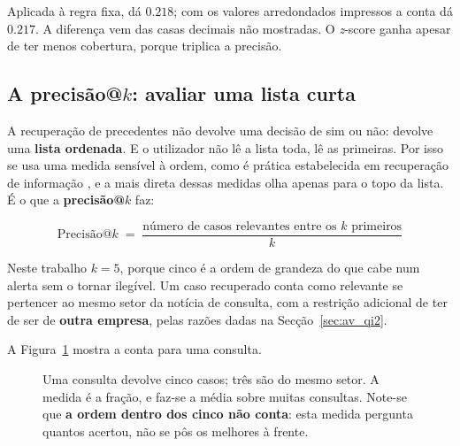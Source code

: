 Aplicada à regra fixa, dá $0.218$; com os valores arredondados impressos a conta dá $0.217$. A
diferença vem das casas decimais não mostradas. O \emph{z}-score ganha apesar de ter menos cobertura,
porque triplica a precisão.

\subsection{A precisão@\texorpdfstring{$k$}{k}: avaliar uma lista curta}
\label{sec:av_patk}

A recuperação de precedentes não devolve uma decisão de sim ou não: devolve uma \textbf{lista
ordenada}. E o utilizador não lê a lista toda, lê as primeiras. Por isso se usa uma medida sensível
à ordem, como é prática estabelecida em recuperação de informação \autocite{manning2008ir}, e a mais
direta dessas medidas olha apenas para o topo da lista. É o que a \textbf{precisão@$k$} faz:

\begin{equation}
  \text{Precisão@}k \;=\; \frac{\text{número de casos relevantes entre os } k \text{ primeiros}}{k}
  \label{eq:patk}
\end{equation}

Neste trabalho $k = 5$, porque cinco é a ordem de grandeza do que cabe num alerta sem o tornar
ilegível. Um caso recuperado conta como relevante se pertencer ao mesmo setor da notícia de consulta,
com a restrição adicional de ter de ser de \textbf{outra empresa}, pelas razões dadas na
Secção~\ref{sec:av_qi2}.

A Figura~\ref{fig:av_patk} mostra a conta para uma consulta.

\begin{figure}[ht]
\centering
{}
\caption[A precisão@5 numa consulta]{Uma consulta devolve cinco casos; três são do mesmo setor. A
medida é a fração, e faz-se a média sobre muitas consultas. Note-se que \textbf{a ordem dentro dos
cinco não conta}: esta medida pergunta quantos acertou, não se pôs os melhores à frente.}
\label{fig:av_patk}
\end{figure}

